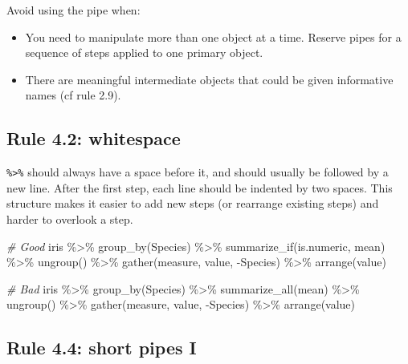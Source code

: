 \documentclass[
  letterpaper,
  DIV=11,
  numbers=noendperiod]{scrreprt}
\newenvironment{Shaded}{\begin{snugshade}}{\end{snugshade}}
\newcommand{\CommentTok}[1]{\textcolor[rgb]{0.38,0.63,0.69}{\textit{#1}}}
\newcommand{\FunctionTok}[1]{\textcolor[rgb]{0.02,0.16,0.49}{#1}}
\newcommand{\NormalTok}[1]{\textcolor[rgb]{0.00,0.44,0.13}{#1}}
\newcommand{\SpecialCharTok}[1]{\textcolor[rgb]{0.25,0.44,0.63}{#1}}
\begin{document}
Avoid using the pipe when:

\begin{itemize}
\item
  You need to manipulate more than one object at a time. Reserve pipes
  for a sequence of steps applied to one primary object.
\item
  There are meaningful intermediate objects that could be given
  informative names (cf rule 2.9).
\end{itemize}

\hypertarget{rule-4.2-whitespace}{%
\subsection{Rule 4.2: whitespace}\label{rule-4.2-whitespace}}

\texttt{\%\textgreater{}\%} should always have a space before it, and
should usually be followed by a new line. After the first step, each
line should be indented by two spaces. This structure makes it easier to
add new steps (or rearrange existing steps) and harder to overlook a
step.

\begin{Shaded}
\begin{Highlighting}[]
\CommentTok{\# Good}
\NormalTok{iris }\SpecialCharTok{\%\textgreater{}\%}
  \FunctionTok{group\_by}\NormalTok{(Species) }\SpecialCharTok{\%\textgreater{}\%}
  \FunctionTok{summarize\_if}\NormalTok{(is.numeric, mean) }\SpecialCharTok{\%\textgreater{}\%}
  \FunctionTok{ungroup}\NormalTok{() }\SpecialCharTok{\%\textgreater{}\%}
  \FunctionTok{gather}\NormalTok{(measure, value, }\SpecialCharTok{{-}}\NormalTok{Species) }\SpecialCharTok{\%\textgreater{}\%}
  \FunctionTok{arrange}\NormalTok{(value)}

\CommentTok{\# Bad}
\NormalTok{iris }\SpecialCharTok{\%\textgreater{}\%} \FunctionTok{group\_by}\NormalTok{(Species) }\SpecialCharTok{\%\textgreater{}\%} \FunctionTok{summarize\_all}\NormalTok{(mean) }\SpecialCharTok{\%\textgreater{}\%} 
\FunctionTok{ungroup}\NormalTok{() }\SpecialCharTok{\%\textgreater{}\%} \FunctionTok{gather}\NormalTok{(measure, value, }\SpecialCharTok{{-}}\NormalTok{Species) }\SpecialCharTok{\%\textgreater{}\%}
\FunctionTok{arrange}\NormalTok{(value)}
\end{Highlighting}
\end{Shaded}

\hypertarget{rule-4.4-short-pipes-i}{%
\subsection{Rule 4.4: short pipes I}\label{rule-4.4-short-pipes-i}}
\end{document}
